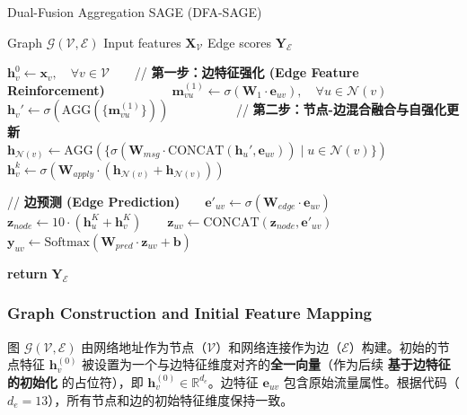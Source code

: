 \documentclass{article}
\begin{document}
\begin{algorithm}
\caption{Dual-Fusion Aggregation SAGE (DFA-SAGE)}
\label{alg:dfa-sage}
\begin{algorithmic}[1]
\Require Graph $\mathcal{G}(\mathcal{V}, \mathcal{E})$ 
\Require Input features $\mathbf{X}_{\mathcal{V}}$ 
\Ensure Edge scores $\mathbf{Y}_{\mathcal{E}}$ 

\State $\mathbf{h}_v^{0} \leftarrow \mathbf{x}_v, \quad \forall v \in \mathcal{V}$ 
 
    \State // \textbf{第一步：边特征强化 (Edge Feature Reinforcement)}
        \State $\mathbf{m}_{vu}^{(1)} \leftarrow \sigma(\mathbf{W}_{1} \cdot \mathbf{e}_{uv}), \quad \forall u \in \mathcal{N}(v)$
        \State $\mathbf{h}_v' \leftarrow \sigma(\text{AGG}(\{\mathbf{m}_{vu}^{(1)}\})) $ 
    \EndFor
    
    \State // \textbf{第二步：节点-边混合融合与自强化更新}
        \State $\mathbf{h}_{\mathcal{N}(v)} \leftarrow \text{AGG}(\{\sigma(\mathbf{W}_{msg} \cdot \text{CONCAT}(\mathbf{h}_u', \mathbf{e}_{uv})) \mid u \in \mathcal{N}(v)\})$
        \State $\mathbf{h}_v^k \leftarrow \sigma(\mathbf{W}_{apply} \cdot (\mathbf{h}_{\mathcal{N}(v)} + \mathbf{h}_{\mathcal{N}(v)}))$ 
    \EndFor
\EndFor

\State // \textbf{边预测 (Edge Prediction)}
    \State $\mathbf{e}'_{uv} \leftarrow \sigma(\mathbf{W}_{edge} \cdot \mathbf{e}_{uv})$
    \State $\mathbf{z}_{node} \leftarrow 10 \cdot (\mathbf{h}_u^K + \mathbf{h}_v^K)$ 
    \State $\mathbf{z}_{uv} \leftarrow \text{CONCAT}(\mathbf{z}_{node}, \mathbf{e}'_{uv})$
    \State $\mathbf{y}_{uv} \leftarrow \text{Softmax}(\mathbf{W}_{pred} \cdot \mathbf{z}_{uv} + \mathbf{b})$
\EndFor

\State \textbf{return} $\mathbf{Y}_{\mathcal{E}}$
\end{algorithmic}
\end{algorithm}

\subsubsection{Graph Construction and Initial Feature Mapping}

图 $\mathcal{G}(\mathcal{V}, \mathcal{E})$ 由网络地址作为节点（$\mathcal{V}$）和网络连接作为边（$\mathcal{E}$）构建。初始的节点特征 $\mathbf{h}_v^{(0)}$ 被设置为一个与边特征维度对齐的\textbf{全一向量}（作为后续 \textbf{基于边特征的初始化} 的占位符），即 $\mathbf{h}_v^{(0)} \in \mathbb{R}^{d_{e}}$。边特征 $\mathbf{e}_{uv}$ 包含原始流量属性。根据代码（$d_{e}=13$），所有节点和边的初始特征维度保持一致。
\end{document}
